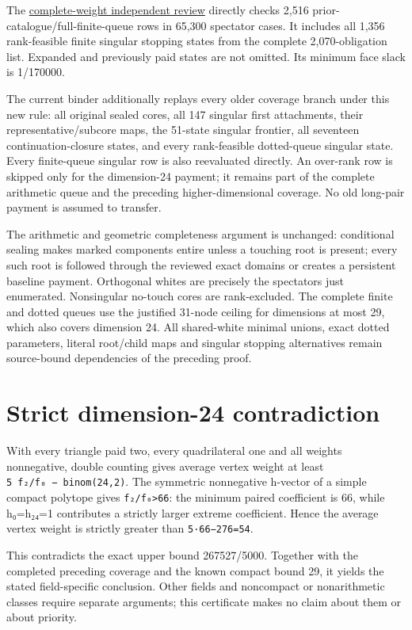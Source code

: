 \documentclass[
  10pt,
]{report}
\begin{document}
The
\href{fresh_sqrt5_dimension24_i25_cross_20261015_review.md}{complete-weight
independent review} directly checks 2,516
prior-catalogue/full-finite-queue rows in 65,300 spectator cases. It
includes all 1,356 rank-feasible finite singular stopping states from
the complete 2,070-obligation list. Expanded and previously paid states
are not omitted. Its minimum face slack is 1/170000.

The current binder additionally replays every older coverage branch
under this new rule: all original sealed cores, all 147 singular first
attachments, their representative/subcore maps, the 51-state singular
frontier, all seventeen continuation-closure states, and every
rank-feasible dotted-queue singular state. Every finite-queue singular
row is also reevaluated directly. An over-rank row is skipped only for
the dimension-24 payment; it remains part of the complete arithmetic
queue and the preceding higher-dimensional coverage. No old long-pair
payment is assumed to transfer.

The arithmetic and geometric completeness argument is unchanged:
conditional sealing makes marked components entire unless a touching
root is present; every such root is followed through the reviewed exact
domains or creates a persistent baseline payment. Orthogonal whites are
precisely the spectators just enumerated. Nonsingular no-touch cores are
rank-excluded. The complete finite and dotted queues use the justified
31-node ceiling for dimensions at most 29, which also covers dimension
24. All shared-white minimal unions, exact dotted parameters, literal
root/child maps and singular stopping alternatives remain source-bound
dependencies of the preceding proof.

\section{Strict dimension-24
contradiction}\label{strict-dimension-24-contradiction}

With every triangle paid two, every quadrilateral one and all weights
nonnegative, double counting gives average vertex weight at least
\texttt{5\ f₂/f₀\ −\ binom(24,2)}. The symmetric nonnegative h-vector of
a simple compact polytope gives \texttt{f₂/f₀\textgreater{}66}: the
minimum paired coefficient is 66, while h₀=h₂₄=1 contributes a strictly
larger extreme coefficient. Hence the average vertex weight is strictly
greater than \texttt{5·66−276=54}.

This contradicts the exact upper bound 267527/5000. Together with the
completed preceding coverage and the known compact bound 29, it yields
the stated field-specific conclusion. Other fields and noncompact or
nonarithmetic classes require separate arguments; this certificate makes
no claim about them or about priority.
\end{document}
